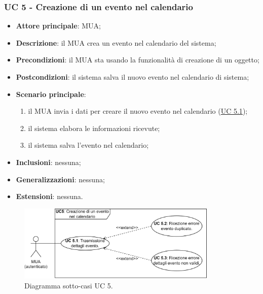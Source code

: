 \subsubsection{UC 5 - Creazione di un evento nel calendario} \label{sec:UC5}
    \begin{itemize}
        \item \textbf{Attore principale}: MUA;
        \item \textbf{Descrizione}: il MUA crea un evento nel calendario del sistema;
        \item \textbf{Precondizioni}: il MUA sta usando la funzionalità di creazione di un oggetto;
        \item \textbf{Postcondizioni}: il sistema salva il nuovo evento nel calendario di sistema;
        \item \textbf{Scenario principale}:
            \begin{enumerate}
                \item il MUA invia i dati per creare il nuovo evento nel calendario (\hyperref[sec:UC5.1]{UC 5.1});
                \item il sistema elabora le informazioni ricevute;
                \item il sistema salva l'evento nel calendario;
            \end{enumerate}
        \item \textbf{Inclusioni}: nessuna;
        \item \textbf{Generalizzazioni}: nessuna;
        \item \textbf{Estensioni}: nessuna.
    \end{itemize}

\begin{figure}[h]
    \includegraphics[width=0.85\textwidth]{sections/uc_imgs/UC05.X.png}
    \centering
    \caption{Diagramma sotto-casi UC 5.}
\end{figure}

